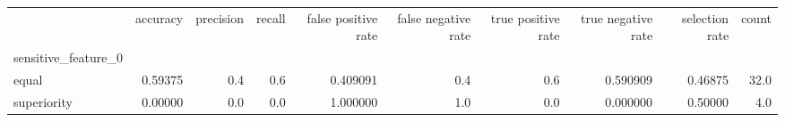 \begin{tabular}{lrrrrrrrrr}
\toprule
{} &  accuracy &  precision &  recall &  false positive rate &  false negative rate &  true positive rate &  true negative rate &  selection rate &  count \\
sensitive\_feature\_0 &           &            &         &                      &                      &                     &                     &                 &        \\
\midrule
equal               &   0.59375 &        0.4 &     0.6 &             0.409091 &                  0.4 &                 0.6 &            0.590909 &         0.46875 &   32.0 \\
superiority         &   0.00000 &        0.0 &     0.0 &             1.000000 &                  1.0 &                 0.0 &            0.000000 &         0.50000 &    4.0 \\
\bottomrule
\end{tabular}
